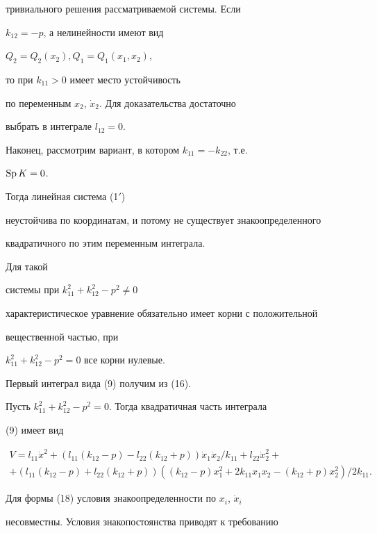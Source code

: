 тривиального решения рассматриваемой системы. Если


$k_{12}=-p$, а нелинейности имеют вид


$Q_{2}=Q_{2}(x_{2}), Q_{1}=Q_{1}(x_{1},x_{2})$,


то при $k_{11}>0$ имеет место устойчивость


по переменным $x_{2}$, $\Dot{x}_{2}$. Для доказательства достаточно


выбрать в интеграле $l_{12}=0$.





Наконец, рассмотрим вариант, в котором $k_{11}=-k_{22}$, т.е.


$\operatorname{Sp} K=0$.


Тогда линейная система (1$'$)


неустойчива по координатам, и потому не существует знакоопределенного


квадратичного по этим переменным интеграла.


Для такой


системы при $k_{11}^{2}+k_{12}^{2}-p^{2}\ne 0$


характеристическое уравнение обязательно имеет корни с положительной


вещественной частью, при


$k_{11}^{2}+k_{12}^{2}-p^{2}=0$ все корни нулевые.


Первый интеграл вида (9) получим из (16).


Пусть $k_{11}^{2}+k_{12}^{2}-p^{2}=0$. Тогда квадратичная часть интеграла


(9) имеет вид


\begin{multline}


V=l_{11}\Dot{x}^{2}+(l_{11}(k_{12}-p)-


l_{22}(k_{12}+p))\Dot {x}_{1}\Dot x_{2}/k_{11}+


l_{22}\Dot{x}_{2}^{2}+ \\


%


+(l_{11}(k_{12}-p)+l_{22}(k_{12}+p))((k_{12}-p)x_{1}^{2}+


2k_{11}x_{1}x_{2}-(k_{12}+p)x_{2}^{2})/2k_{11}. \tag{18}


\end{multline}


Для формы (18) условия знакоопределенности по $x_{i}$, $\Dot x_{i}$


несовместны. Условия знакопостоянства приводят к требованию



